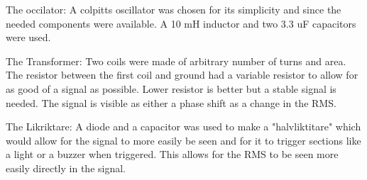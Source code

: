 % 

The occilator:
A colpitts oscillator was chosen for its simplicity and since the needed components were available. A 10 mH inductor and two 
3.3 uF capacitors were used.

The Transformer:
Two coils were made of arbitrary number of turns and area. The resistor between the first coil and ground had a variable resistor to allow
 for as good of a signal as possible. Lower resistor is better but a stable signal is needed. The signal is visible as either a phase shift
 as a change in the RMS.

The Likriktare:
A diode and a capacitor was used to make a "halvliktitare" which would allow for the signal to more easily be seen and for it to trigger
 sections like a light or a buzzer when triggered. This allows for the RMS to be seen more easily directly in the signal.